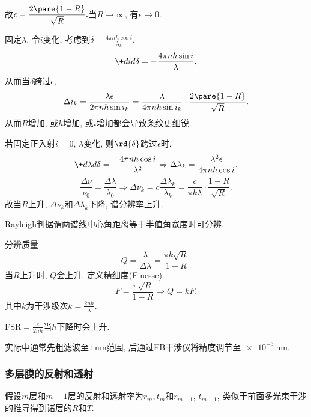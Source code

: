 \documentclass{ctexart}
\begin{document}
故$\epsilon = \displaystyle \frac{2\pare{1-R}}{\sqrt{R}}. $当$R\rightarrow\infty$, 有$\epsilon\rightarrow 0$.
\par
固定$\lambda$, 令$i$变化, 考虑到$\displaystyle \delta = \frac{4\pi nh\cos i}{\lambda_k}$,
\[ \+did\delta = -\frac{4\pi nh\sin i}{\lambda}, \]
从而当$\delta$跨过$\epsilon$,
\[ \Delta i_k = \frac{\lambda\epsilon}{2\pi nh\sin i_k} = \frac{\lambda}{4\pi nh\sin i_k}\cdot \frac{2\pare{1-R}}{\sqrt{R}}. \]
从而$R$增加, 或$h$增加, 或$i$增加都会导致条纹更细锐.
\par
若固定正入射$i=0$, $\lambda$变化, 则$\rd{\delta}$跨过$\epsilon$时,
\[ \+d\lambda d\delta = -\frac{4\pi nh\cos i}{\lambda^2} \Rightarrow \Delta\lambda_k = \frac{\lambda^2\epsilon}{4\pi nh\cos i}. \]
\[ \frac{\Delta \nu}{\nu_0} = \frac{\Delta\lambda}{\lambda_0} \Rightarrow \Delta\nu_k = c\frac{\Delta \lambda_k}{\lambda_k} = \frac{c}{\pi k\lambda} \cdot \frac{1-R}{\sqrt{R}}. \]
故当$R$上升, $\Delta \nu_k$和$\Delta \lambda_k$下降, 谱分辨率上升.
\begin{remark}
    Rayleigh判据谓两谱线中心角距离等于半值角宽度时可分辨.
\end{remark}
分辨质量
\[ Q = \frac{\lambda}{\Delta \lambda} = \frac{\pi k\sqrt{R}}{1-R}. \]
当$R$上升时, $Q$会上升. 定义精细度(Finesse)
\[ F = \frac{\pi \sqrt{R}}{1-R} \Rightarrow Q = kF. \]
其中$k$为干涉级次$\displaystyle k=\frac{2nh}{\lambda}$.
\par
FSR$= \displaystyle \frac{c}{2nh}$当$h$下降时会上升.
\begin{remark}
    实际中通常先粗滤波至$\SI{1}{\nano\meter}$范围, 后通过FB干涉仪将精度调节至$\SI{e-3}{\nano\meter}$.
\end{remark}

\subsubsection{多层膜的反射和透射} %
\label{ssub:多层膜的反射和透射}

\begin{figure}[ht]
    \centering
\end{figure}
假设$m$层和$m-1$层的反射和透射率为$r_m,t_m$和$r_{m-1}$, $t_{m-1}$, 类似于前面多光束干涉的推导得到诸层的$R$和$T$.



\end{document}
